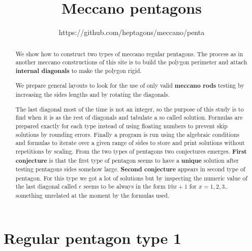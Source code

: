 \documentclass[11pt]{article}
\title{\textbf{Meccano pentagons}}
\author{https://github.com/heptagons/meccano/penta}
\date{}
\begin{document}
\maketitle
\begin{abstract}
We show how to construct two types of meccano regular pentagons.
The process as in another meccano constructions of this site is to build
the polygon perimeter and attach \textbf{internal diagonals} to make the polygon rigid.

We prepare general layouts to look for the use of only valid \textbf{meccano rods} testing 
by increasing the sides lengths and by rotating the diagonals.

The last diagonal most of the time is not an integer, so the purpose of this study is to find
when it is as the rest of diagonals and tabulate a so called solution. Formulas are
prepared exactly for each type instead of using floating numbers to prevent skip solutions by
rounding errors. Finally a program is run using the algebraic conditions and formulas
to iterate over a given range of sides to store and print solutions without repetitions by scaling.
\newline\newline
From the two types of pentagons two conjectures emerges. \textbf{First conjecture} is
that the first type of pentagon seems to have a \textbf{unique} solution after testing
pentagons sides somehow large.
\newline\newline
\textbf{Second conjecture} appears in second type of pentagon. For this type we got a lot of solutions 
but by inspecting the numeric value of the last diagonal called $e$ seems to be always in the form
\textbf{$10x + 1$} for $x = 1,2,3..$ something unrelated at the moment by the formulas used.
\end{abstract}

\section{Regular pentagon type 1}
\end{document}
